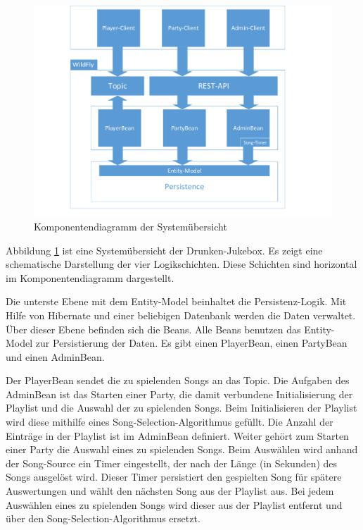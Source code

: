 


\begin{figure}[H]
	\centering
	\includegraphics[width=1\linewidth]{Bilder/Komponentendiagramm}
	\caption{Komponentendiagramm der Systemübersicht }
	\label{fig:Komponentendiagramm}
\end{figure}

Abbildung \ref{fig:Komponentendiagramm} ist eine Systemübersicht der Drunken-Jukebox. Es zeigt eine schematische Darstellung der vier Logikschichten. Diese Schichten sind horizontal im Komponentendiagramm dargestellt.

Die unterste Ebene mit dem Entity-Model beinhaltet die Persistenz-Logik. Mit Hilfe von Hibernate und einer beliebigen Datenbank werden die Daten verwaltet.
Über dieser Ebene befinden sich die Beans. Alle Beans benutzen das Entity-Model zur  Persistierung der Daten. Es gibt einen PlayerBean, einen PartyBean und einen AdminBean.

Der PlayerBean sendet die zu spielenden Songs an das Topic. 
Die Aufgaben des AdminBean ist das Starten einer Party, die damit verbundene Initialisierung der Playlist und die Auswahl der zu spielenden Songs. Beim Initialisieren der Playlist wird diese mithilfe eines Song-Selection-Algorithmus gefüllt. Die Anzahl der Einträge in der Playlist ist im AdminBean definiert. Weiter gehört zum Starten einer Party die Auswahl eines zu spielenden Songs. Beim Auswählen wird anhand der Song-Source  ein Timer eingestellt, der nach der Länge (in Sekunden) des Songs ausgelöst wird. Dieser Timer persistiert den gespielten Song für spätere Auswertungen und wählt den nächsten Song aus der Playlist aus. Bei jedem Auswählen eines zu spielenden Songs wird dieser aus der Playlist entfernt und über den Song-Selection-Algorithmus ersetzt.

